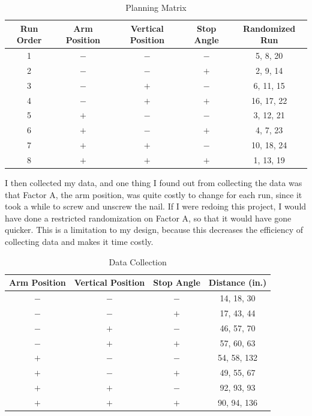 \documentclass[11pt]{article}
\begin{document}
    \begin{table}[h]\caption{Planning Matrix}
    \begin{center}
    {
    \begin{tabular}{|c|ccc|c|}
    \hline
    Run Order & Arm Position & Vertical Position & Stop Angle & Randomized Run \\
    \hline
    1 & $-$ & $-$ & $-$ &  5, 8, 20 \\
    2 & $-$ & $-$ & $+$ &  2, 9, 14  \\
    3 & $-$ & $+$ & $-$ &  6, 11, 15 \\
    4 & $-$ & $+$ & $+$ &  16, 17, 22 \\
    5 & $+$ & $-$ & $-$ &  3, 12, 21 \\
    6 & $+$ & $-$ & $+$ &  4, 7, 23 \\
    7 & $+$ & $+$ & $-$ &  10, 18, 24 \\
    8 & $+$ & $+$ & $+$ &  1, 13, 19 \\
    \hline
    \end{tabular}
    }
\end{center}

\end{table}
I then collected my data, and one thing I found out from collecting the data was that Factor A, the arm position, was quite costly to change for each run, since it took a while to screw and unscrew the nail. If I were redoing this project, I would have done a restricted randomization on Factor A, so that it would have gone quicker. This is a limitation to my design, because this decreases the efficiency of collecting data and makes it time costly.

     \begin{table}[H]\caption{Data Collection}
    \begin{center}
    {
    \begin{tabular}{|ccc|c|}
    \hline
     Arm Position & Vertical Position & Stop Angle & Distance (in.) \\
    \hline
    $-$ & $-$ & $-$ &  14, 18, 30 \\
    $-$ & $-$ & $+$ &  17, 43, 44  \\
    $-$ & $+$ & $-$ &  46, 57, 70 \\
    $-$ & $+$ & $+$ &  57, 60, 63 \\
    $+$ & $-$ & $-$ &  54, 58, 132 \\
    $+$ & $-$ & $+$ &  49, 55, 67 \\
    $+$ & $+$ & $-$ &  92, 93, 93 \\
    $+$ & $+$ & $+$ &  90, 94, 136 \\
    \hline
    \end{tabular}
    }
\end{center}
\end{table}
\end{document}
